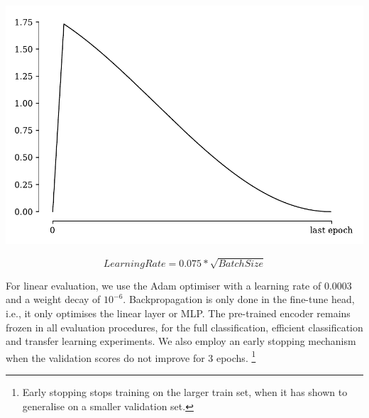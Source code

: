 \begin{marginfigure}
    \includegraphics[width=\textwidth]{figs/cosine_annealing_schedule.pdf}
    \caption{Learning rate schedule: a warm-up is performed before the learning rate is adjusted using a cosine annealing schedule. In this example, the learning rate linearly scales to 1.75 before decreasing back to near-zero at the last epoch.}
    \label{fig:cosine_annealing_lr}
\end{marginfigure}

\begin{equation}
    \label{eq:sqrt_lr}
    Learning Rate = 0.075 * \sqrt{Batch Size}
\end{equation}

For linear evaluation, we use the Adam optimiser with a learning rate of $0.0003$ and a weight decay of $10^{-6}$. Backpropagation is only done in the fine-tune head, i.e., it only optimises the linear layer or MLP. The pre-trained encoder remains frozen in all evaluation procedures, for the full classification, efficient classification and transfer learning experiments.
We also employ an early stopping mechanism when the validation scores do not improve for 3 epochs. \footnote{Early stopping stops training on the larger train set, when it has shown to generalise on a smaller validation set.}